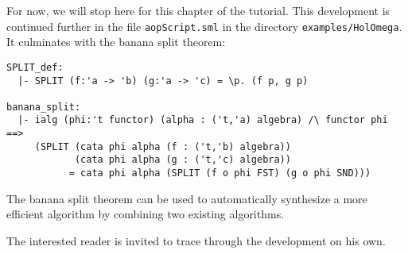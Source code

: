 \newpage
For now, we will stop here for this 
chapter of the tutorial.
This development is continued further
in the file {\tt aopScript.sml}
in the directory {\tt examples/HolOmega}.
It 
culminates with the banana split theorem:
%
\begin{session}
\begin{verbatim}
SPLIT_def:
  |- SPLIT (f:'a -> 'b) (g:'a -> 'c) = \p. (f p, g p)

banana_split:
  |- ialg (phi:'t functor) (alpha : ('t,'a) algebra) /\ functor phi ==>
     (SPLIT (cata phi alpha (f : ('t,'b) algebra))
            (cata phi alpha (g : ('t,'c) algebra))
           = cata phi alpha (SPLIT (f o phi FST) (g o phi SND)))
\end{verbatim}
\end{session}

\noindent
The banana split theorem can be used to automatically synthesize a more
efficient algorithm by combining two existing algorithms.

The interested reader is invited to trace through the development on his own.


% 
% 
% 









